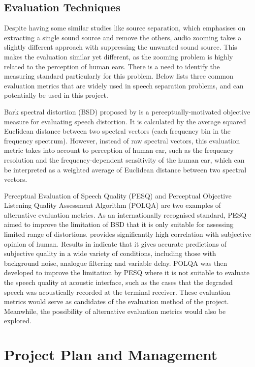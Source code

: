 \documentclass[a4paper,twoside,12pt,hidelinks]{article}
\begin{document}
\subsection{Evaluation Techniques}
\label{evaltec}
Despite having some similar studies like source separation, which emphasises on extracting a single sound source and remove the others, audio zooming takes a slightly different approach with suppressing the unwanted sound source. This makes the evaluation similar yet different, as the zooming problem is highly related to the perception of human ears. There is a need to identify the measuring standard particularly for this problem. Below lists three common evaluation metrics that are widely used in speech separation problems, and can potentially be used in this project.

Bark spectral distortion (BSD) proposed by \cite{Wang1992AnCoders} is a perceptually-motivated objective measure for evaluating speech distortion. It is calculated by the average squared Euclidean distance between two spectral vectors (each frequency bin in the frequency spectrum). However, instead of raw spectral vectors, this evaluation metric takes into account to perception of human ear, such as the frequency resolution and the frequency-dependent sensitivity of the human ear, which can be interpreted as a weighted average of Euclidean distance between two spectral vectors.

Perceptual Evaluation of Speech Quality (PESQ) \cite{RixPerceptualCodecs} and Perceptual Objective Listening Quality Assessment Algorithm (POLQA) \cite{Yi2012ThePOLQA} are two examples of alternative evaluation metrics. As an internationally recognised standard, PESQ aimed to improve the limitation of BSD that it is only suitable for assessing limited range of distortions. provides significantly high correlation with subjective opinion of human. Results in \cite{RixPerceptualCodecs} indicate that it gives accurate predictions of subjective quality in a wide variety of conditions, including those with background noise, analogue filtering and variable delay. POLQA was then developed to improve the limitation by PESQ where it is not suitable to evaluate the speech quality at acoustic interface, such as the cases that the degraded speech was acoustically recorded at the terminal receiver. These evaluation metrics would serve as candidates of the evaluation method of the project. Meanwhile, the possibility of alternative evaluation metrics would also be explored.

\newpage
\section{Project Plan and Management}
\end{document}

